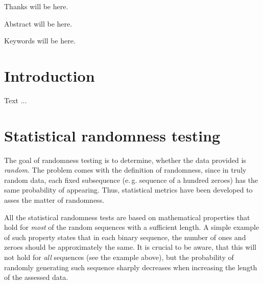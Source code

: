 \documentclass[12pt,oneside]{fithesis2}
\begin{document}
\FrontMatter
\ThesisTitlePage

\begin{ThesisDeclaration}
\DeclarationText
\AdvisorName
\end{ThesisDeclaration}

\begin{ThesisThanks}
Thanks will be here.
\end{ThesisThanks}

\begin{ThesisAbstract}
Abstract will be here.
\end{ThesisAbstract}

\begin{ThesisKeyWords}
Keywords will be here.
\end{ThesisKeyWords}

\MainMatter
\tableofcontents
\chapter{Introduction}
\label{chap:intro}
Text ...

\chapter{Statistical randomness testing}
\label{chap:stat-rand-testing}

The goal of randomness testing is to determine, whether the data provided is \textit{random}. 
The problem comes with the definition of randomness, since in truly random data, 
each fixed subsequence (e.\,g. sequence of a hundred zeroes) has the same probability of appearing.
Thus, statistical metrics have been developed to asses the matter of randomness.

All the statistical randomness tests are based on mathematical properties that hold for
\textit{most} of the random sequences with a sufficient length.
A simple example of such property states that in each binary sequence, the number of ones and zeroes should be 
approximately the same. It is crucial to be aware, that this will not hold for \textit{all} sequences (see the example above),
but the probability of randomly generating such sequence sharply decreases when increasing the length of the assessed data.
\end{document}
